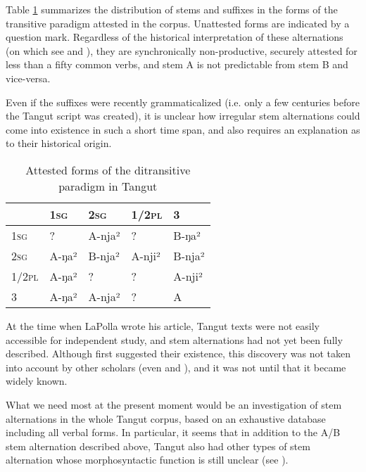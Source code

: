 \documentclass[oldfontcommands,oneside,a4paper,11pt]{article}
\newcommand{\ipa}[1]{{\phon \mbox{#1}}} %
\newcommand{\sg}{\textsc{sg}}
\newcommand{\pl}{\textsc{pl}}
\begin{document}
Table \ref{tab:paradigm} summarizes the distribution of stems and suffixes in the forms of the transitive paradigm attested in the corpus. Unattested forms are indicated by a question mark. Regardless of the historical interpretation of these alternations (on which see \citealt{jacques09tangutverb} and \citealt{jacques14esquisse}), they are synchronically non-productive, securely attested for less than a fifty common verbs, and stem A is not predictable from stem B and vice-versa. %

Even if the suffixes were recently grammaticalized (i.e. only a few centuries before the Tangut script was created), it is unclear how irregular stem alternations could come into existence in such a short time span, and also requires an explanation as to their historical origin.

\begin{table}[H]
\caption{Attested forms of the ditransitive paradigm in Tangut}\centering  \label{tab:paradigm}
\begin{tabular}{lllll}
\toprule
	&	1\sg{}	&	2\sg{}	&	1/2\pl{}	&	3	\\
	\midrule
1\sg{}	&	?	&	A-\ipa{nja²}	&	?	&	 B-\ipa{ŋa²}	\\
2\sg{}	&	A-\ipa{ŋa²}	&	B-\ipa{nja²}	&	A-\ipa{nji²}	&	 B-\ipa{nja²}	\\
1/2\pl{}	&	 A-\ipa{ŋa²}	& ?	&	?	&	A-\ipa{nji²}	\\
3	&	A-\ipa{ŋa²}	&	A-\ipa{nja²}	&	?	&	A 	\\
\bottomrule
\end{tabular}
\end{table}

At the time when LaPolla wrote his article, Tangut texts were not easily accessible for independent study, and stem alternations had not yet been fully described. Although \citet{nishida75} first suggested their existence, this discovery was not taken into account by other scholars (even \citealt{kepping85} and \citealt{driem91tangut}), and it was not until \citet{gong01huying} that it became widely known.

 What we need most at the present moment would be an investigation of stem alternations in the whole Tangut corpus, based on an exhaustive database including all verbal forms. In particular, it seems that in addition to the A/B stem alternation described above, Tangut also had other types of stem alternation whose morphosyntactic function is still unclear (see \citealt{jacques14esquisse}).
\end{document}
